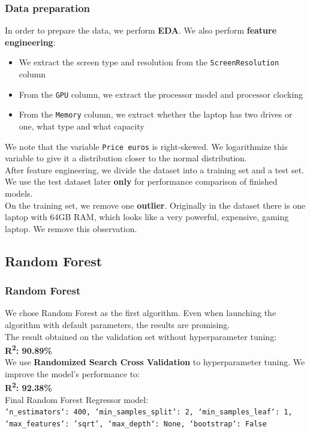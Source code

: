 \documentclass[8pt]{beamer}
\begin{document}
\begin{frame}
\frametitle{Data preparation}
In order to prepare the data, we perform \textbf{EDA}. We also perform \textbf{feature engineering}:
\begin{itemize}
    \item<1-> We extract the screen type and resolution from the \texttt{ScreenResolution} column
    \item<1-> From the \texttt{GPU} column, we extract the processor model and processor clocking
    \item<1-> From the \texttt{Memory} column, we extract whether the laptop has two drives or one, what type and what capacity
\end{itemize}
\vspace{2mm}
We note that the variable \texttt{Price euros} is right-skewed. We logarithmize this variable to give it a distribution closer to the normal distribution.\\
\vspace{2mm}
After feature engineering, we divide the dataset into a training set and a test set. We use the test dataset later \textbf{only} for performance comparison of finished models.\\
\vspace{2mm}
On the training set, we remove one \textbf{outlier}. Originally in the dataset there is one laptop with 64GB RAM, which looks like a very powerful, expensive, gaming laptop. We remove this observation.
\end{frame}


\subsection{Random Forest}
\begin{frame}
\frametitle{Random Forest}
We chose Random Forest as the first algorithm. Even when launching the algorithm with default parameters, the results are promising.\\
The result obtained on the validation set without hyperparameter tuning:\\ \textbf{R\textsuperscript{2}: 90.89\%} \\
\vspace{2mm}
We use \textbf{Randomized Search Cross Validation} to hyperparameter tuning. We improve the model's performance to:\\ \textbf{R\textsuperscript{2}: 92.38\%}\\
\vspace{2mm}
Final Random Forest Regressor model:\\ \texttt{`n\_estimators`: 400, `min\_samples\_split`: 2, `min\_samples\_leaf`: 1, `max\_features`: 'sqrt', `max\_depth`: None, `bootstrap`: False}
\end{frame}
\end{document}

